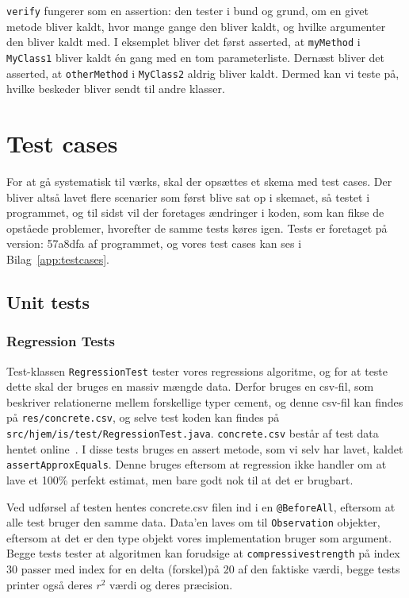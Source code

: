 \texttt{verify} fungerer som en assertion: den tester i bund og grund, om en givet metode bliver kaldt, hvor mange gange den bliver kaldt, og hvilke argumenter den bliver kaldt med. I eksemplet bliver det først asserted, at \texttt{myMethod} i \texttt{MyClass1} bliver kaldt én gang med en tom parameterliste. Dernæst bliver det asserted, at \texttt{otherMethod} i \texttt{MyClass2} aldrig bliver kaldt. Dermed kan vi teste på, hvilke beskeder bliver sendt til andre klasser.

\section{Test cases}
For at gå systematisk til værks, skal der opsættes et skema med test cases\cite{Heumann}. Der bliver altså lavet flere scenarier som først blive sat op i skemaet, så testet i programmet, og til sidst vil der foretages ændringer i koden, som kan fikse de opståede problemer, hvorefter de samme tests køres igen. Tests er foretaget på version: 57a8dfa af programmet, og vores test cases kan ses i Bilag~\ref{app:testcases}.

\subsection{Unit tests}
\subsubsection{Regression Tests}
Test-klassen \texttt{RegressionTest} tester vores regressions algoritme, og for at teste dette skal der bruges en massiv mængde data. Derfor bruges en csv-fil, som beskriver relationerne mellem forskellige typer cement, og denne csv-fil kan findes på \texttt{res/concrete.csv}, og selve test koden kan findes på \texttt{src/hjem/is/test/RegressionTest.java}. \texttt{concrete.csv} består af test data hentet online~\cite{ExampleSales}. I disse tests bruges en assert metode, som vi selv har lavet, kaldet \texttt{assertApproxEquals}. Denne bruges eftersom at regression ikke handler om at lave et 100\% perfekt estimat, men bare godt nok til at det er brugbart.

Ved udførsel af testen hentes concrete.csv filen ind i en \texttt{@BeforeAll}, eftersom at alle test bruger den samme data. Data'en laves om til \texttt{Observation} objekter, eftersom at det er den type objekt vores implementation bruger som argument. Begge tests tester at algoritmen kan forudsige at \texttt{compressivestrength} på index 30 passer med index for en delta (forskel)på 20 af den faktiske værdi, begge tests printer også deres $r^{2}$ værdi og deres præcision.

